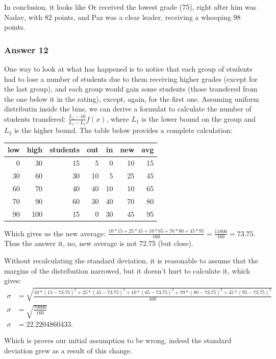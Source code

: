 \documentclass[11pt]{article}
\begin{document}
In conclusion, it looks like Or received the lowest grade (75), right
after him was Nadav, with 82 points, and Paz was a clear leader,
receiving a whooping 98 points.
\subsubsection{Answer 12}
\label{sec-1-3-4}
One way to look at what has happened is to notice that each group of
students had to lose a number of students due to them receiving higher
grades (except for the last group), and each group would gain some
students (those transfered from the one below it in the rating),
except, again, for the first one.  Assuming uniform distributin inside
the bins, we can derive a formulat to calculate the number of students
transfered: $\frac{L_1 - 10}{L_1 - L_2}f(x)$, where $L_1$ is the lower
bound on the group and $L_2$ is the higher bound.  The table below
provides a complete calculation:

\begin{center}
\begin{tabular}{rrrrrrr}
low & high & students & out & in & new & avg\\
\hline
0 & 30 & 15 & 5 & 0 & 10 & 15\\
30 & 60 & 30 & 10 & 5 & 25 & 45\\
60 & 70 & 40 & 40 & 10 & 10 & 65\\
70 & 90 & 60 & 30 & 40 & 70 & 80\\
90 & 100 & 15 & 0 & 30 & 45 & 95\\
\end{tabular}
\end{center}

Which gives us the new average:
$\frac{10*15+25*45+10*65+70*80+45*95}{160}=\frac{11800}{160}=73.75$.
Thus the answer it, no, new average is not 72.75 (but close).

Without recalculating the standard deviation, it is reasonable to
assume that the margins of the distribution narrowed, but it doesn't
hurt to calculate it, which gives:
\begin{equation*}
  \begin{aligned}
    \sigma &= \sqrt{\frac{10 * (15 - 73.75)^2 + 25 * (45 - 73.75)^2 +
        10 * (65 - 73.75)^2 + 70 * (80 - 73.75)^2 + 45 * (95 - 73.75)^2}{160}} \\
    \sigma &= \sqrt{\frac{79000}{160}} \\
    \sigma &= 22.2204860433.
  \end{aligned}
\end{equation*}

Which is proves our initial assumption to be wrong, indeed the standard
deviation grew as a result of this change.
\end{document}
